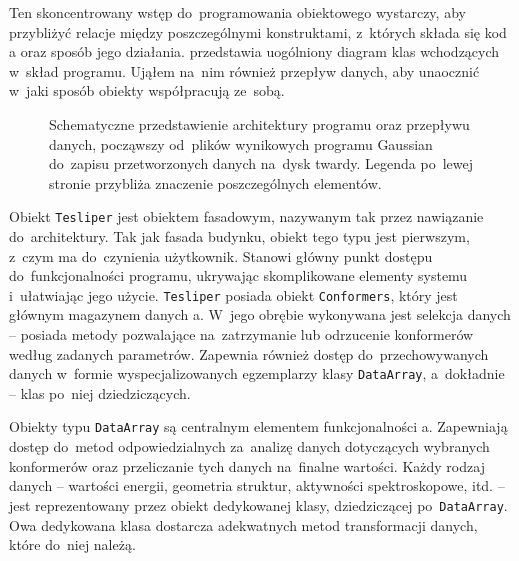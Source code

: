 Ten skoncentrowany wstęp do~programowania obiektowego wystarczy, aby przybliżyć relacje między
  poszczególnymi konstruktami, z~których składa się kod \tesliper{}a oraz sposób jego działania.
 przedstawia uogólniony diagram klas wchodzących w~skład programu.
Ująłem na~nim również przepływ danych, aby unaocznić w~jaki sposób obiekty współpracują ze~sobą.

\begin{figure}
  
  \caption{
    Schematyczne przedstawienie architektury programu \tesliper{} oraz przepływu danych,
      począwszy od~plików wynikowych programu Gaussian do~zapisu przetworzonych danych
      na~dysk twardy.
    Legenda po~lewej stronie przybliża znaczenie poszczególnych elementów.
  }
  \label{fig:class-diagram}
\end{figure}

Obiekt \texttt{Tesliper} jest obiektem fasadowym, nazywanym tak przez nawiązanie do~architektury.
Tak jak fasada budynku, obiekt tego typu jest pierwszym, z~czym ma do~czynienia użytkownik.
Stanowi główny punkt dostępu do~funkcjonalności programu, ukrywając skomplikowane elementy
  systemu i~ułatwiając jego użycie.
\texttt{Tesliper} posiada obiekt \texttt{Conformers},
  który jest głównym magazynem danych \tesliper{}a.
W~jego obrębie wykonywana jest selekcja danych \--- posiada metody pozwalające
  na~zatrzymanie lub odrzucenie
  konformerów według zadanych parametrów.
Zapewnia również dostęp do~przechowywanych danych w~formie wyspecjalizowanych egzemplarzy
  klasy \texttt{DataArray}, a~dokładnie \--- klas po~niej dziedziczących.

Obiekty typu \texttt{DataArray} są centralnym elementem funkcjonalności \tesliper{}a.
Zapewniają dostęp do~metod odpowiedzialnych za~analizę danych dotyczących wybranych konformerów
  oraz przeliczanie tych danych na~finalne wartości.
Każdy rodzaj danych \--- wartości energii, geometria struktur, aktywności spektroskopowe, itd.
  \--- jest reprezentowany przez obiekt dedykowanej klasy, dziedziczącej po~\texttt{DataArray}.
Owa dedykowana klasa dostarcza adekwatnych metod transformacji danych, które do~niej należą.

